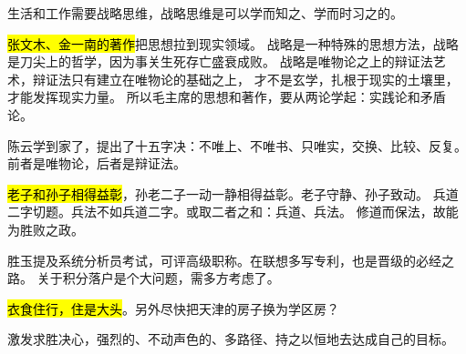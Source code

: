 生活和工作需要战略思维，战略思维是可以学而知之、学而时习之的。

\hl{张文木、金一南的著作}把思想拉到现实领域。
战略是一种特殊的思想方法，战略是刀尖上的哲学，因为事关生死存亡盛衰成败。
战略是唯物论之上的辩证法艺术，辩证法只有建立在唯物论的基础之上，
才不是玄学，扎根于现实的土壤里，才能发挥现实力量。
所以毛主席的思想和著作，要从两论学起：实践论和矛盾论。

陈云学到家了，提出了十五字决：不唯上、不唯书、只唯实，交换、比较、反复。
前者是唯物论，后者是辩证法。

\hl{老子和孙子相得益彰}，孙老二子一动一静相得益彰。老子守静、孙子致动。
兵道二字切题。兵法不如兵道二字。或取二者之和：兵道、兵法。
修道而保法，故能为胜败之政。

\hrulefill

胜玉提及系统分析员考试，可评高级职称。在联想多写专利，也是晋级的必经之路。
关于积分落户是个大问题，需多方考虑了。

\hl{衣食住行，住是大头}。另外尽快把天津的房子换为学区房？

激发求胜决心，强烈的、不动声色的、多路径、持之以恒地去达成自己的目标。

\hrulefill

